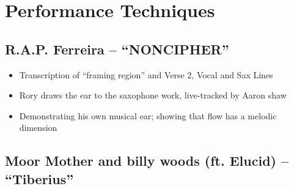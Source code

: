 \newpage
\section{Performance Techniques}
\subsection*{\centering R.A.P. Ferreira -- ``NONCIPHER''}
    \begin{itemize}
        \item Transcription of ``framing region'' and Verse 2, Vocal and Sax Lines
        \item Rory draws the ear to the saxophone work, live-tracked by Aaron shaw
        \item Demonstrating his own musical ear; showing that flow has a melodic dimension
    \end{itemize}
  
\subsection*{\centering Moor Mother and billy woods (ft. Elucid)  -- ``Tiberius''}
